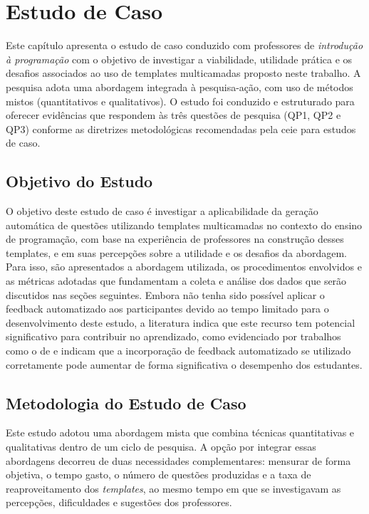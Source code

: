 \chapter{Estudo de Caso}
Este capítulo apresenta o estudo de caso conduzido com professores de \textit{introdução à programação} com o objetivo de investigar a viabilidade, utilidade prática e os desafios associados ao uso de templates multicamadas proposto neste trabalho. A pesquisa adota uma abordagem integrada à pesquisa-ação, com uso de métodos mistos (quantitativos e qualitativos). O estudo foi conduzido e estruturado para oferecer evidências que respondem às três questões de pesquisa (QP1, QP2 e QP3) conforme as diretrizes metodológicas recomendadas pela \gls{ceie} para estudos de caso.

\section{Objetivo do Estudo}
O objetivo deste estudo de caso é investigar a aplicabilidade da geração automática de questões utilizando templates multicamadas no contexto do ensino de programação, com base na experiência de professores na construção desses templates, e em suas percepções sobre a utilidade e os desafios da abordagem. Para isso, são apresentados a abordagem utilizada,  os procedimentos envolvidos e as métricas adotadas que fundamentam a coleta e análise dos dados que serão discutidos nas seções seguintes.
Embora não tenha sido possível aplicar o feedback automatizado aos participantes devido ao tempo limitado para o desenvolvimento deste estudo, a literatura  indica que este recurso tem potencial significativo para contribuir no aprendizado, como evidenciado por trabalhos como o de \parencite{vanpraet2024} e \parencite{fung2024} indicam que a incorporação de feedback automatizado se utilizado corretamente pode aumentar de forma significativa o desempenho dos estudantes.

\section{Metodologia do Estudo de Caso}

Este estudo adotou uma abordagem mista que combina técnicas quantitativas e qualitativas dentro de um ciclo de pesquisa. A opção por integrar essas abordagens decorreu de duas necessidades complementares: mensurar de forma objetiva, o tempo gasto, o número de questões produzidas e a taxa de reaproveitamento dos \textit{templates}, ao mesmo tempo em que se investigavam as percepções, dificuldades e sugestões dos professores.


